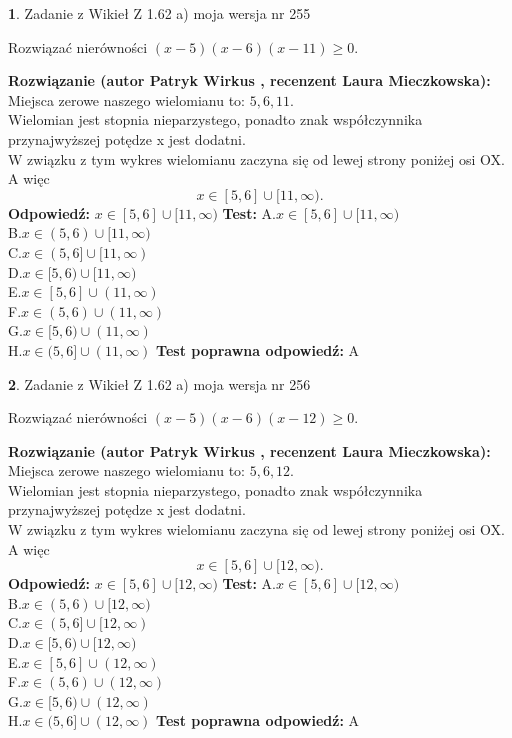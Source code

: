 \documentclass[12pt, a4paper]{article}
\theoremstyle{definition} %
\newtheorem{zad}{}
\newcommand{\zadStart}[1]{\begin{zad}#1\newline}
\newcommand{\zadStop}{\end{zad}}
\newcommand{\rozwStart}[2]{\noindent \textbf{Rozwiązanie (autor #1 , recenzent #2): }\newline}
\newcommand{\rozwStop}{\newline}
\newcommand{\odpStart}{\noindent \textbf{Odpowiedź:}\newline}
\newcommand{\odpStop}{\newline}
\newcommand{\testStart}{\noindent \textbf{Test:}\newline}
\newcommand{\testStop}{\newline}
\newcommand{\kluczStart}{\noindent \textbf{Test poprawna odpowiedź:}\newline}
\newcommand{\kluczStop}{\newline}
\begin{document}
\zadStart{Zadanie z Wikieł Z 1.62 a) moja wersja nr 255}

Rozwiązać nierówności $(x-5)(x-6)(x-11)\ge0$.
\zadStop
\rozwStart{Patryk Wirkus}{Laura Mieczkowska}
Miejsca zerowe naszego wielomianu to: $5, 6, 11$.\\
Wielomian jest stopnia nieparzystego, ponadto znak współczynnika przy\linebreak najwyższej potędze x jest dodatni.\\ W związku z tym wykres wielomianu zaczyna się od lewej strony poniżej osi OX. A więc $$x \in [5,6] \cup [11,\infty).$$
\rozwStop
\odpStart
$x \in [5,6] \cup [11,\infty)$
\odpStop
\testStart
A.$x \in [5,6] \cup [11,\infty)$\\
B.$x \in (5,6) \cup [11,\infty)$\\
C.$x \in (5,6] \cup [11,\infty)$\\
D.$x \in [5,6) \cup [11,\infty)$\\
E.$x \in [5,6] \cup (11,\infty)$\\
F.$x \in (5,6) \cup (11,\infty)$\\
G.$x \in [5,6) \cup (11,\infty)$\\
H.$x \in (5,6] \cup (11,\infty)$
\testStop
\kluczStart
A
\kluczStop



\zadStart{Zadanie z Wikieł Z 1.62 a) moja wersja nr 256}

Rozwiązać nierówności $(x-5)(x-6)(x-12)\ge0$.
\zadStop
\rozwStart{Patryk Wirkus}{Laura Mieczkowska}
Miejsca zerowe naszego wielomianu to: $5, 6, 12$.\\
Wielomian jest stopnia nieparzystego, ponadto znak współczynnika przy\linebreak najwyższej potędze x jest dodatni.\\ W związku z tym wykres wielomianu zaczyna się od lewej strony poniżej osi OX. A więc $$x \in [5,6] \cup [12,\infty).$$
\rozwStop
\odpStart
$x \in [5,6] \cup [12,\infty)$
\odpStop
\testStart
A.$x \in [5,6] \cup [12,\infty)$\\
B.$x \in (5,6) \cup [12,\infty)$\\
C.$x \in (5,6] \cup [12,\infty)$\\
D.$x \in [5,6) \cup [12,\infty)$\\
E.$x \in [5,6] \cup (12,\infty)$\\
F.$x \in (5,6) \cup (12,\infty)$\\
G.$x \in [5,6) \cup (12,\infty)$\\
H.$x \in (5,6] \cup (12,\infty)$
\testStop
\kluczStart
A
\kluczStop
\end{document}
